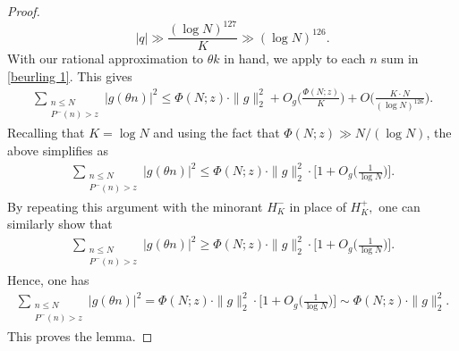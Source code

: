 \documentclass[12pt]{amsart}
\renewcommand{\leq}{\leqslant}
\renewcommand{\ge}{\geqslant}
\numberwithin{equation}{section}
\theoremstyle{plain}
\theoremstyle{definition}
\begin{document}
\begin{proof}
		$$|q| \gg \frac{(\log N)^{127}}{K} \gg (\log N)^{126}.$$
		With our rational approximation to $\theta k$ in hand, we apply  to each $n$ sum in \eqref{beurling 1}. This gives
		\begin{align}\label{beurling 1.5}
			\sum_{\substack{n \leq N \\ P^-(n) > z}} |g(\theta n)|^2 \leq \Phi(N;z) \cdot \|g\|_2^2  + O_g\bigg(\frac{\Phi(N;z)}{K}\bigg) + O\bigg( \frac{K \cdot N}{(\log N)^{126}}  \bigg).
		\end{align}
		Recalling that $K = \log N$ and using the fact that $\Phi(N;z) \gg N/ (\log N)$, the above simplifies as
		\begin{align*}
			\sum_{\substack{n \leq N \\ P^-(n) > z}} |g(\theta n)|^2 \leq \Phi(N;z) \cdot \|g\|_2^2 \cdot \bigg[ 1 + O_g\bigg(\frac{1}{\log N}\bigg)\bigg].
		\end{align*}
		By repeating this argument with the minorant $H_K^-$ in place of $H_K^+,$ one can similarly show that
		\begin{align*}
			\sum_{\substack{n \leq N \\ P^-(n) > z}} |g(\theta n)|^2 \ge \Phi(N;z) \cdot \|g\|_2^2 \cdot \bigg[ 1 + O_g\bigg(\frac{1}{\log N}\bigg)\bigg].
		\end{align*}
		Hence, one has
		\begin{align*}
			\sum_{\substack{n \leq N \\ P^-(n) > z}} |g(\theta n)|^2 = \Phi(N;z) \cdot \|g\|_2^2 \cdot \bigg[ 1 + O_g\bigg(\frac{1}{\log N}\bigg)\bigg] \sim \Phi(N;z) \cdot \|g\|_2^2.
		\end{align*}
		This proves the lemma.
	\end{proof}
\end{document}
